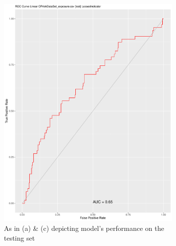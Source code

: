 \documentclass[
]{article}
\begin{document}
\begin{figure}[t!]
\medskip
\begin{subfigure}{0.48\textwidth}
\includegraphics[width=\linewidth]{POI_ROC_Testing.pdf}
\caption{As in (a) \& (c) depicting model's performance on the testing set} \label{POI_ROC_Test}
\end{subfigure}\hspace*{\fill}
\begin{subfigure}{0.48\textwidth}

\end{subfigure}
\end{figure}
\end{document}
